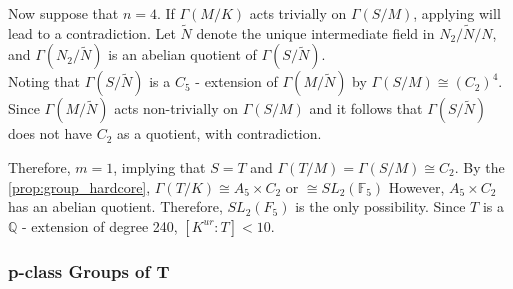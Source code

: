 \documentclass[12pt]{extarticle}
\newcommand{\Q}{\mathbb{Q}}
\newcommand{\<}{\langle}
\renewcommand{\>}{\rangle}
\theoremstyle{definition}
\begin{document}
Now suppose that $n=4$. 
If $\Gamma(M/K)$ acts trivially on $\Gamma(S/M)$, applying  will lead to a contradiction. Let $\tilde{N}$ denote the unique intermediate field in $N_2/\tilde{N}/N$, and $\Gamma(N_2/\tilde{N})$ is an abelian quotient of $\Gamma(S/\tilde{N})$. \\ 
Noting that $\Gamma(S/\tilde{N})$ is a $C_5$ - extension of
$\Gamma(M/\tilde{N})$ by $\Gamma(S/M) \cong (C_2)^{4}$. Since 
$\Gamma(M/\tilde{N})$ acts non-trivially on $\Gamma(S/M)$
 and it follows that $\Gamma(S/\tilde{N})$ does not have $C_2$ as a quotient, with contradiction. \\ \par
Therefore, $m = 1$, implying that $S=T$ and $\Gamma(T/M) = \Gamma(S/M) \cong C_2$. By the \cref{prop:group_hardcore}, $\Gamma(T/K) \cong A_5 \times C_2$ or $\cong SL_2(\mathbb{F}_5)$ However, $A_5 \times C_2$ has an abelian quotient. Therefore, $SL_2(F_5)$ is the only possibility. Since $T$ is a $\Q$ - extension of degree 240, $[K^{ur}:T] < 10$. 

\subsubsection{p-class Groups of T}
\end{document}
